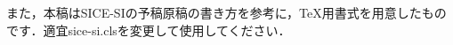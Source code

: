\documentclass{sice-si}
\begin{document}

また，本稿はSICE-SIの予稿原稿の書き方\cite{SI}\cite{SIbook}\cite{WebPage}を参考に，\TeX 用書式を用意したものです．適宜sice-si.clsを変更して使用してください．



\end{document}
